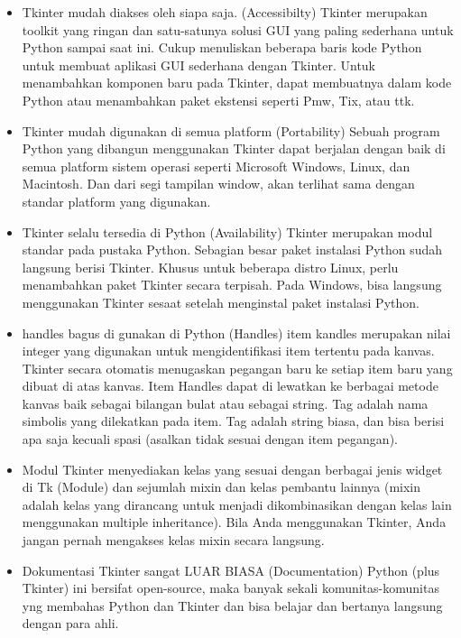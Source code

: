 \documentclass [12pt,a4paper,notitlepage,oneside,bahasa]{article}
\begin{document}
\noindent 
\begin{itemize}
\item Tkinter mudah diakses oleh siapa saja. (Accessibilty)\vspace{\baselineskip}
Tkinter merupakan toolkit yang ringan dan satu-satunya solusi GUI yang paling sederhana untuk Python sampai saat ini. Cukup menuliskan 
beberapa baris kode Python untuk membuat aplikasi GUI sederhana dengan Tkinter. Untuk menambahkan komponen baru pada Tkinter, dapat 
membuatnya dalam kode Python atau menambahkan paket ekstensi seperti Pmw, Tix, atau ttk. \par
\noindent 
\item Tkinter mudah digunakan di semua platform (Portability)\vspace{\baselineskip}
Sebuah program Python yang dibangun menggunakan Tkinter dapat berjalan dengan baik di semua platform sistem operasi seperti Microsoft 
Windows, Linux, dan Macintosh. Dan dari segi tampilan window, akan terlihat sama dengan standar platform yang digunakan. \par
\noindent 
\item Tkinter selalu tersedia di Python (Availability)\vspace{\baselineskip}
Tkinter merupakan modul standar pada pustaka Python. Sebagian besar paket instalasi Python sudah langsung berisi Tkinter. Khusus untuk 
beberapa distro Linux, perlu menambahkan paket Tkinter secara terpisah. Pada Windows, bisa langsung menggunakan Tkinter sesaat setelah 
menginstal paket instalasi Python. \par
\noindent 
\item handles bagus di gunakan di Python (Handles)\vspace{\baselineskip}
item kandles merupakan nilai integer yang digunakan untuk mengidentifikasi item tertentu pada kanvas. Tkinter secara otomatis menugaskan 
pegangan baru ke setiap item baru yang dibuat di atas kanvas. Item Handles dapat di lewatkan ke berbagai metode kanvas baik sebagai 
bilangan bulat atau sebagai string. Tag adalah nama simbolis yang dilekatkan pada item. Tag adalah string biasa, dan bisa berisi apa 
saja kecuali spasi (asalkan tidak sesuai dengan item pegangan). \par
\noindent 
\item Modul Tkinter menyediakan kelas yang sesuai dengan berbagai jenis widget di Tk (Module)\vspace{\baselineskip}
dan sejumlah mixin dan kelas pembantu lainnya (mixin adalah kelas yang dirancang untuk menjadi
dikombinasikan dengan kelas lain menggunakan multiple inheritance). Bila Anda menggunakan Tkinter, Anda
jangan pernah mengakses kelas mixin secara langsung. \par
\noindent 
\item Dokumentasi Tkinter sangat LUAR BIASA (Documentation)\vspace{\baselineskip}
Python (plus Tkinter) ini bersifat open-source, maka banyak sekali komunitas-komunitas yng membahas Python dan Tkinter dan bisa belajar dan bertanya langsung dengan para ahli.\end{itemize}
 \par
\vspace{12pt}
\vspace{12pt}
\end{document}
